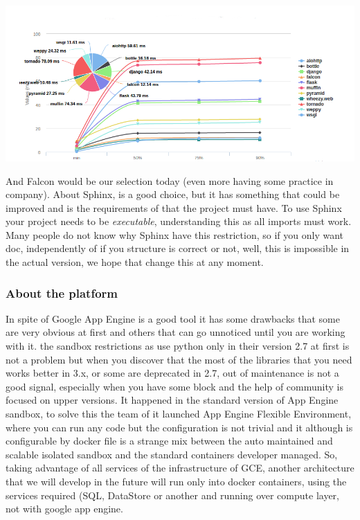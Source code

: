 \begin{center}
\includegraphics[scale=0.5]{img/graphics/frameworks.png}
\end{center}

\noindent And Falcon would be our selection today (even more having some practice in
company).
\intro
About Sphinx, is a good choice, but it has something that could be improved and
is the requirements of that the project must have. To use Sphinx your project
needs to be \textit{executable}, understanding this as all imports must work.
Many people do not know why Sphinx have this restriction, so if you
only want doc, independently of if you structure is correct or not, well, this is
impossible in the actual version, we hope that change this at any moment.

\subsubsection{About the platform}

In spite of Google App Engine is a good tool it has some drawbacks that some are
very obvious at first and others that can go unnoticed until you are working with it.
the sandbox restrictions as use python only in their version 2.7 at first is not
a problem but when you discover that the most of the libraries that you need works
better in 3.x, or some are deprecated in 2.7, out of maintenance is not a good
signal, especially when you have some block and the help of community is focused
on upper versions. It happened in the standard version of App Engine sandbox, to
solve this the team of it launched App Engine Flexible Environment, where you can
run any code but the configuration is not trivial and it although is configurable by
docker file is a strange mix between the auto maintained and scalable isolated
sandbox and the standard containers developer managed.
\intro
So, taking advantage of all services of the infrastructure of GCE, another
architecture that we will develop in the future will run only into docker containers,
using the services required (SQL, DataStore or another and running over compute layer,
not with google app engine.


